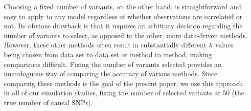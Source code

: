 Choosing a fixed number of variants, on the other hand, is straightforward and easy to apply to any model regardless of whether observations are correlated or not.  Its obvious drawback is that it requires an arbitrary decision regarding the number of variants to select, as opposed to the other, more data-driven methods.  However, these other methods often result in substantially different $\lambda$ values being chosen from data set to data set or method to method, making comparisons difficult.  Fixing the number of variants selected provides an unambiguous way of comparing the accuracy of various methods.  Since comparing these methods is the goal of the present paper, we use this approach in all of our simulation studies, fixing the number of selected variants at 50 (the true number of causal SNPs).





